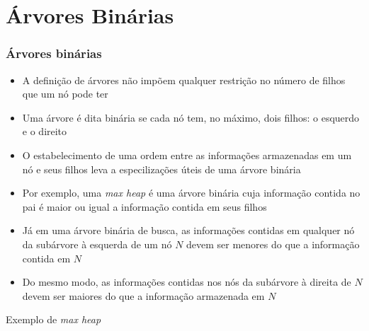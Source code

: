 \section{Árvores Binárias}

\begin{frame}

    \frametitle{Árvores binárias}

    \begin{itemize}
        \item A definição de árvores {não impõem} qualquer restrição no 
        {número de filhos} que um nó pode ter
        

        \item Uma árvore é dita {binária} se cada nó tem, no máximo, dois filhos: o 
            {esquerdo} e o {direito}
        
        \item O estabelecimento de uma ordem entre as informações armazenadas em um nó e seus
            filhos leva a especilizações úteis de uma árvore binária

        \item Por exemplo, uma \textit{max heap} é uma árvore binária cuja informação contida no
            pai é maior ou igual a informação contida em seus filhos

        \item Já em uma árvore binária de busca, as informações contidas em qualquer nó da
            subárvore à esquerda de um nó $N$ devem ser menores do que a informação contida em $N$

        \item Do mesmo modo, as informações contidas nos nós da subárvore à direita de $N$ devem ser
            maiores do que a informação armazenada em $N$
    \end{itemize}

\end{frame}

\begin{frame}[fragile]{Exemplo de \textit{max heap}} 



\end{frame}

